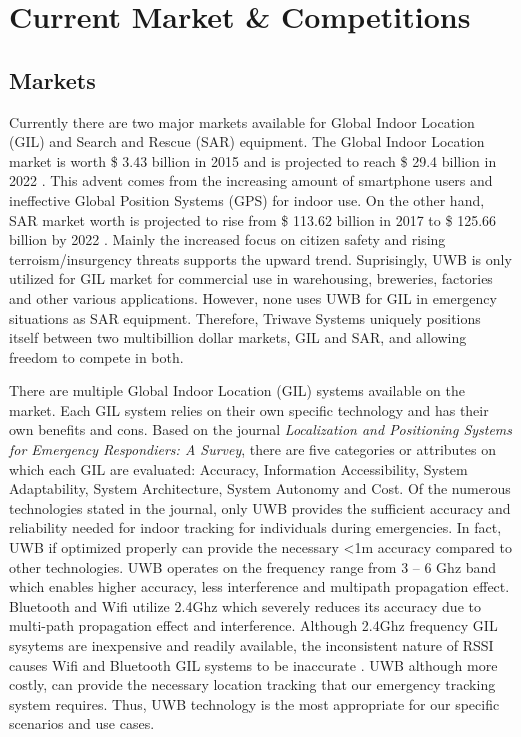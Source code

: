 

\setcounter{section}{2}
\section{Current Market \& Competitions}

\subsection{Markets}
Currently there are two major markets available for Global Indoor Location (\Gls{GIL}) and Search and Rescue (\Gls{SAR}) equipment. 
The Global Indoor Location market is worth \$ 3.43 billion in 2015 and is projected to reach \$ 29.4 billion in 2022 \cite{R3-1}. This advent 
comes from the increasing amount of smartphone users and ineffective Global Position Systems (\Gls{GPS}) for indoor use. On the other hand, SAR market 
worth is projected to rise from \$ 113.62 billion in 2017 to \$ 125.66 billion by 2022 \cite{R3-2}. Mainly the increased focus on citizen 
safety and rising terroism/insurgency threats supports the upward trend. Suprisingly, UWB is only utilized for GIL market for commercial use in 
warehousing, breweries, factories and other various applications. However, none uses UWB for GIL in emergency situations as SAR equipment. 
Therefore, Triwave Systems uniquely positions itself between two multibillion dollar markets, GIL and SAR, and allowing freedom to compete in both. 

\bigskip

There are multiple Global Indoor Location (GIL) systems available on the market. Each GIL system relies on their own specific technology and has 
their own benefits and cons. Based on the journal \textit{Localization and Positioning Systems for Emergency Respondiers: A Survey}\cite{R3-3}, 
there are five categories or attributes on which each GIL are evaluated: Accuracy, Information Accessibility, System Adaptability, System 
Architecture, System Autonomy and Cost. Of the numerous technologies stated in the journal, only UWB provides the sufficient accuracy and 
reliability needed for indoor tracking for individuals during emergencies. In fact, UWB if optimized properly can provide the necessary <1m 
accuracy compared to other technologies. UWB operates on the frequency range from 3 – 6 Ghz band which enables higher accuracy, less interference 
and multipath propagation effect. Bluetooth and Wifi utilize 2.4Ghz which severely reduces its accuracy due to multi-path propagation effect 
and interference. Although 2.4Ghz frequency GIL sysytems are inexpensive and readily available, the inconsistent nature of RSSI causes Wifi and 
Bluetooth GIL systems to be inaccurate \cite{R3-4}. UWB although more costly, can provide the necessary location tracking that our emergency 
tracking system requires. Thus, UWB technology is the most appropriate for our specific scenarios and use cases.

